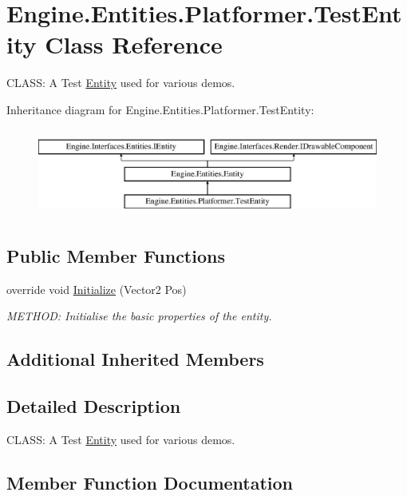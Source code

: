 \hypertarget{a00330}{}\section{Engine.\+Entities.\+Platformer.\+Test\+Entity Class Reference}
\label{a00330}


C\+L\+A\+SS\+: A Test \hyperlink{a00314}{Entity} used for various demos.  


Inheritance diagram for Engine.\+Entities.\+Platformer.\+Test\+Entity\+:\begin{figure}[H]
\begin{center}
\leavevmode
\includegraphics[height=2.916667cm]{dd/dbb/a00330}
\end{center}
\end{figure}
\subsection*{Public Member Functions}
\begin{DoxyCompactItemize}
\item 
override void \hyperlink{a00330_ad4122c4f38d98746a67532d0a6836da5}{Initialize} (Vector2 Pos)
\begin{DoxyCompactList}\small\item\em M\+E\+T\+H\+OD\+: Initialise the basic properties of the entity. \end{DoxyCompactList}\end{DoxyCompactItemize}
\subsection*{Additional Inherited Members}


\subsection{Detailed Description}
C\+L\+A\+SS\+: A Test \hyperlink{a00314}{Entity} used for various demos. 



\subsection{Member Function Documentation}
\mbox{\label{a00330_ad4122c4f38d98746a67532d0a6836da5}} 
